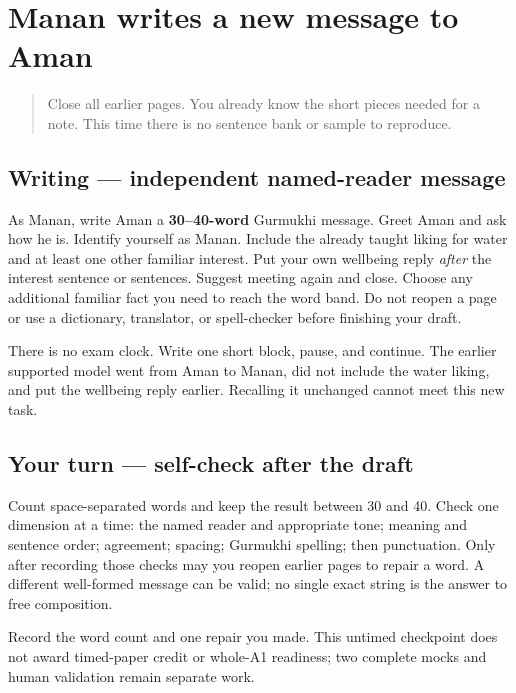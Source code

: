 \section[(independent named-reader message)]{Manan writes a new message to Aman}

\label{lesson:PA-W12-message-no-model}



\begin{quote}
Close all earlier pages. You already know the short pieces needed for a note. This time there is no sentence bank or sample to reproduce.
\end{quote}

\subsection*{Writing — independent named-reader message}
As Manan, write Aman a \textbf{30–40-word} Gurmukhi message. Greet Aman and ask how he is. Identify yourself as Manan. Include the already taught liking for water and at least one other familiar interest. Put your own wellbeing reply \emph{after} the interest sentence or sentences. Suggest meeting again and close. Choose any additional familiar fact you need to reach the word band. Do not reopen a page or use a dictionary, translator, or spell-checker before finishing your draft.

There is no exam clock. Write one short block, pause, and continue. The earlier supported model went from Aman to Manan, did not include the water liking, and put the wellbeing reply earlier. Recalling it unchanged cannot meet this new task.

\subsection*{Your turn — self-check after the draft}
Count space-separated words and keep the result between 30 and 40. Check one dimension at a time: the named reader and appropriate tone; meaning and sentence order; agreement; spacing; Gurmukhi spelling; then punctuation. Only after recording those checks may you reopen earlier pages to repair a word. A different well-formed message can be valid; no single exact string is the answer to free composition.

\begin{tcolorbox}[breakable,colback=teal!4,colframe=teal!35!black,title={Before you move on}]
Record the word count and one repair you made. This untimed checkpoint does not award timed-paper credit or whole-A1 readiness; two complete mocks and human validation remain separate work.
\end{tcolorbox}

